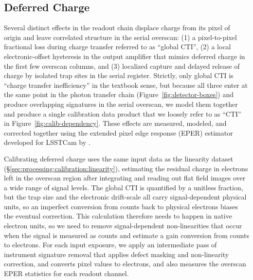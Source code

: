 

\subsection{Deferred Charge} \label{sec:processing:calibration:cti}

Several distinct effects in the readout chain displace charge from its pixel of origin and leave correlated structure in the serial overscan: (1) a pixel-to-pixel fractional loss during charge transfer referred to as ``global CTI'', (2) a local electronic-offset hysteresis in the output amplifier that mimics deferred charge in the first few overscan columns, and (3) localized capture and delayed release of charge by isolated trap sites in the serial register.
Strictly, only global CTI is ``charge transfer inefficiency'' in the textbook sense, but because all three enter at the same point in the photon transfer chain (Figure~\ref{fig:detector-boxes}) and produce overlapping signatures in the serial overscan, we model them together and produce a single calibration data product that we loosely refer to as ``CTI'' in Figure~\ref{fig:calib-dependency}.
These effects are measured, modeled, and corrected together using the extended pixel edge response (EPER) estimator developed for LSSTCam by \citet{snyder2021}.

Calibrating deferred charge uses the same input data as the linearity dataset (\S\ref{sec:processing:calibration:linearity}), estimating the residual charge in electrons left in the overscan region after integrating and reading out flat field images over a wide range of signal levels.
The global CTI is quantified by a unitless fraction, but the trap size and the electronic drift-scale all carry signal-dependent physical units, so an imperfect conversion from counts back to physical electrons biases the eventual correction.
This calculation therefore needs to happen in native electron units, so we need to remove signal-dependent non-linearities that occur when the signal is measured as counts and estimate a gain conversion from counts to electrons.
For each input exposure, we apply an intermediate pass of instrument signature removal that applies defect masking and non-linearity correction, and converts pixel values to electrons, and also measures the overscan EPER statistics for each readout channel.

